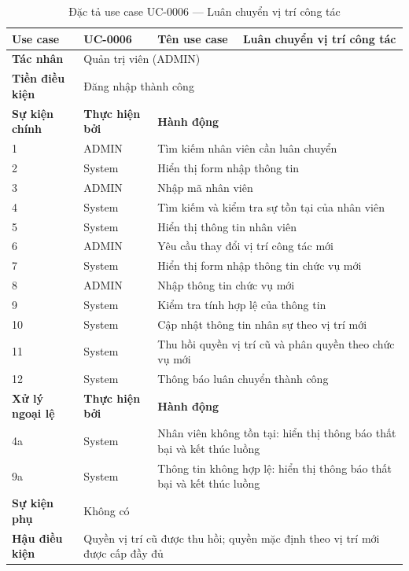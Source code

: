 \documentclass[../DoAn.tex]{subfiles}
\begin{document}
\begin{table}[H]
\centering
\caption{Đặc tả use case UC-0006 — Luân chuyển vị trí công tác}
\label{tab:uc-0006}
\renewcommand{\arraystretch}{1.3}
\begin{tabular}{|p{3.0cm}|p{2.3cm}|p{2.7cm}|p{4.5cm}|}
\hline
\textbf{Use case} & UC-0006 & \textbf{Tên use case} & Luân chuyển vị trí công tác \\
\hline
\textbf{Tác nhân} & \multicolumn{3}{p{9.5cm}|}{Quản trị viên (ADMIN)} \\
\hline
\textbf{Tiền điều kiện} & \multicolumn{3}{p{9.5cm}|}{Đăng nhập thành công} \\
\hline
\textbf{Sự kiện chính} & \textbf{Thực hiện bởi} & \multicolumn{2}{p{7.2cm}|}{\textbf{Hành động}} \\
\hline
1 & ADMIN & \multicolumn{2}{p{7.2cm}|}{Tìm kiếm nhân viên cần luân chuyển} \\
\hline
2 & System & \multicolumn{2}{p{7.2cm}|}{Hiển thị form nhập thông tin} \\
\hline
3 & ADMIN & \multicolumn{2}{p{7.2cm}|}{Nhập mã nhân viên} \\
\hline
4 & System & \multicolumn{2}{p{7.2cm}|}{Tìm kiếm và kiểm tra sự tồn tại của nhân viên} \\
\hline
5 & System & \multicolumn{2}{p{7.2cm}|}{Hiển thị thông tin nhân viên} \\
\hline
6 & ADMIN & \multicolumn{2}{p{7.2cm}|}{Yêu cầu thay đổi vị trí công tác mới} \\
\hline
7 & System & \multicolumn{2}{p{7.2cm}|}{Hiển thị form nhập thông tin chức vụ mới} \\
\hline
8 & ADMIN & \multicolumn{2}{p{7.2cm}|}{Nhập thông tin chức vụ mới} \\
\hline
9 & System & \multicolumn{2}{p{7.2cm}|}{Kiểm tra tính hợp lệ của thông tin} \\
\hline
10 & System & \multicolumn{2}{p{7.2cm}|}{Cập nhật thông tin nhân sự theo vị trí mới} \\
\hline
11 & System & \multicolumn{2}{p{7.2cm}|}{Thu hồi quyền vị trí cũ và phân quyền theo chức vụ mới} \\
\hline
12 & System & \multicolumn{2}{p{7.2cm}|}{Thông báo luân chuyển thành công} \\
\hline
\textbf{Xử lý ngoại lệ} & \textbf{Thực hiện bởi} & \multicolumn{2}{p{7.2cm}|}{\textbf{Hành động}} \\
\hline
4a & System & \multicolumn{2}{p{7.2cm}|}{Nhân viên không tồn tại: hiển thị thông báo thất bại và kết thúc luồng} \\
\hline
9a & System & \multicolumn{2}{p{7.2cm}|}{Thông tin không hợp lệ: hiển thị thông báo thất bại và kết thúc luồng} \\
\hline
\textbf{Sự kiện phụ} & \multicolumn{3}{p{9.5cm}|}{Không có} \\
\hline
\textbf{Hậu điều kiện} & \multicolumn{3}{p{9.5cm}|}{Quyền vị trí cũ được thu hồi; quyền mặc định theo vị trí mới được cấp đầy đủ} \\
\hline
\end{tabular}
\end{table}
\end{document}

